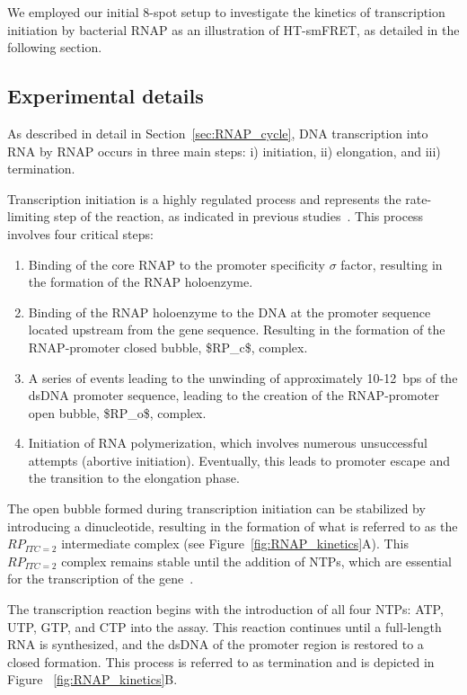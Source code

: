 We employed our initial 8-spot setup to investigate the kinetics of transcription initiation by bacterial \ac{RNAP} as an illustration of \ac{HT-smFRET}, as detailed in the following section.

\subsection{Experimental details}
\label{sec:exp_details_RNAP_kinetics}

As described in detail in Section~\ref{sec:RNAP_cycle}, DNA transcription into RNA by \ac{RNAP} occurs in three main steps: i) initiation, ii) elongation, and iii) termination.

Transcription initiation is a highly regulated process and represents the rate-limiting step of the reaction, as indicated in previous studies~\cite{murakami_structural_2002}. 
This process involves four critical steps:


\begin{enumerate}
\item Binding of the core \ac{RNAP} to the promoter specificity $\sigma$ factor, resulting in the formation of the \ac{RNAP} holoenzyme.
\item Binding of the \ac{RNAP} holoenzyme to the DNA at the promoter sequence located upstream from the gene sequence. 
Resulting in the formation of the RNAP-promoter closed bubble, \ac{$RP_c$}, complex.
\item A series of events leading to the unwinding of approximately 10-12~\ac{bp}s of the \ac{dsDNA} promoter sequence, leading to the creation of the RNAP-promoter open bubble, \ac{$RP_o$}, complex.
\item Initiation of RNA polymerization, which involves numerous unsuccessful attempts (abortive initiation). 
Eventually, this leads to promoter escape and the transition to the elongation phase.
\end{enumerate}

The open bubble formed during transcription initiation can be stabilized by introducing a dinucleotide, resulting in the formation of what is referred to as the $RP_{ITC = 2}$ intermediate complex (see Figure~\ref{fig:RNAP_kinetics}A). This $RP_{ITC = 2}$ complex remains stable until the addition of \ac{NTP}s, which are essential for the transcription of the gene~\cite{lerner_PNAS_2016}.

The transcription reaction begins with the introduction of all four \ac{NTP}s: ATP, UTP, GTP, and CTP into the assay. 
This reaction continues until a full-length RNA is synthesized, and the \ac{dsDNA} of the promoter region is restored to a closed formation.
This process is referred to as termination and is depicted in Figure ~\ref{fig:RNAP_kinetics}B.

